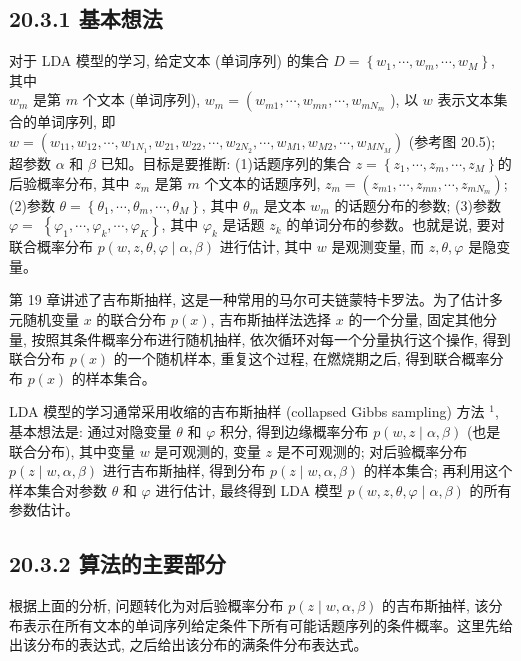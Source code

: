 \documentclass[10pt]{article}
\begin{document}
\begin{CJK*}{UTF8}{bsmi}
\subsection*{20.3.1 基本想法}
对于 LDA 模型的学习, 给定文本 (单词序列) 的集合 $D=\left\{w_{1}, \cdots, w_{m}, \cdots, w_{M}\right\}$, 其中\\
$w_{m}$ 是第 $m$ 个文本 (单词序列), $w_{m}=\left(w_{m 1}, \cdots, w_{m n}, \cdots, w_{m N_{m}}\right.$ ), 以 $w$ 表示文本集合的单词序列, 即 $w=\left(w_{11}, w_{12}, \cdots, w_{1 N_{1}}, w_{21}, w_{22}, \cdots, w_{2 N_{2}}, \cdots, w_{M 1}, w_{M 2}, \cdots, w_{M N_{M}}\right)$ (参考图 20.5); 超参数 $\alpha$ 和 $\beta$ 已知。目标是要推断: (1)话题序列的集合 $z=\left\{z_{1}, \cdots, z_{m}, \cdots, z_{M}\right\}$的后验概率分布, 其中 $z_{m}$ 是第 $m$ 个文本的话题序列, $z_{m}=\left(z_{m 1}, \cdots, z_{m n}, \cdots, z_{m N_{m}}\right)$; (2)参数 $\theta=\left\{\theta_{1}, \cdots, \theta_{m}, \cdots, \theta_{M}\right\}$, 其中 $\theta_{m}$ 是文本 $w_{m}$ 的话题分布的参数; (3)参数 $\varphi=$ $\left\{\varphi_{1}, \cdots, \varphi_{k}, \cdots, \varphi_{K}\right\}$, 其中 $\varphi_{k}$ 是话题 $z_{k}$ 的单词分布的参数。也就是说, 要对联合概率分布 $p(w, z, \theta, \varphi \mid \alpha, \beta)$ 进行估计, 其中 $w$ 是观测变量, 而 $z, \theta, \varphi$ 是隐变量。

第 19 章讲述了吉布斯抽样, 这是一种常用的马尔可夫链蒙特卡罗法。为了估计多元随机变量 $x$ 的联合分布 $p(x)$, 吉布斯抽样法选择 $x$ 的一个分量, 固定其他分量, 按照其条件概率分布进行随机抽样, 依次循环对每一个分量执行这个操作, 得到联合分布 $p(x)$ 的一个随机样本, 重复这个过程, 在燃烧期之后, 得到联合概率分布 $p(x)$ 的样本集合。

LDA 模型的学习通常采用收缩的吉布斯抽样 (collapsed Gibbs sampling) 方法 ${ }^{1}$, 基本想法是: 通过对隐变量 $\theta$ 和 $\varphi$ 积分, 得到边缘概率分布 $p(w, z \mid \alpha, \beta)$ (也是联合分布), 其中变量 $w$ 是可观测的, 变量 $z$ 是不可观测的; 对后验概率分布 $p(z \mid w, \alpha, \beta)$ 进行吉布斯抽样, 得到分布 $p(z \mid w, \alpha, \beta)$ 的样本集合; 再利用这个样本集合对参数 $\theta$ 和 $\varphi$ 进行估计, 最终得到 LDA 模型 $p(w, z, \theta, \varphi \mid \alpha, \beta)$ 的所有参数估计。

\subsection*{20.3.2 算法的主要部分}
根据上面的分析, 问题转化为对后验概率分布 $p(z \mid w, \alpha, \beta)$ 的吉布斯抽样, 该分布表示在所有文本的单词序列给定条件下所有可能话题序列的条件概率。这里先给出该分布的表达式, 之后给出该分布的满条件分布表达式。


\end{CJK*}
\end{document}
